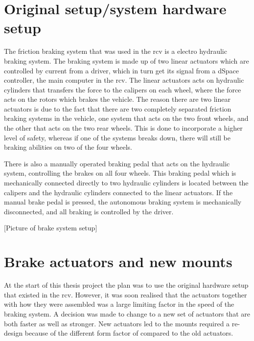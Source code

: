 \documentclass[a4paper,11pt]{kth-mag}
\begin{document}


\section{Original setup/system hardware setup}
The friction braking system that was used in the \gls{rcv} is a electro hydraulic braking system. The braking system is made up of two linear actuators which are controlled by current from a driver, which in turn get its signal from a dSpace controller, the main computer in the \gls{rcv}. The linear actuators acts on hydraulic cylinders that transfers the force to the calipers on each wheel, where the force acts on the rotors which brakes the vehicle. The reason there are two linear actuators is due to the fact that there are two completely separated friction braking systems in the vehicle, one system that acts on the two front wheels, and the other that acts on the two rear wheels. This is done to incorporate a higher level of safety, whereas if one of the systems breaks down, there will still be braking abilities on two of the four wheels. \newline

There is also a manually operated braking pedal that acts on the hydraulic system, controlling the brakes on all four wheels. This braking pedal which is mechanically connected directly to two hydraulic cylinders is located between the calipers and the hydraulic cylinders connected to the linear actuators. If the manual brake pedal is pressed, the autonomous braking system is mechanically disconnected, and all braking is controlled by the driver. \newline

[Picture of brake system setup]

\section{Brake actuators and new mounts}
At the start of this thesis project the plan was to use the original hardware setup that existed in the \gls{rcv}. However, it was soon realised that the actuators together with how they were assembled was a large limiting factor in the speed of the braking system. A decision was made to change to a new set of actuators that are both faster as well as stronger. New actuators led to the mounts required a re-design because of the different form factor of compared to the old actuators. 
\end{document}
